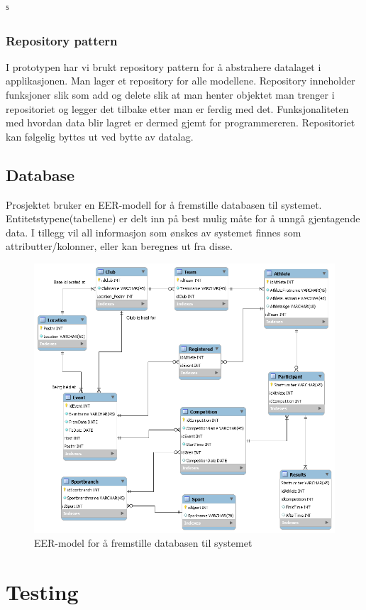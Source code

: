 ⁵\documentclass[norsk]{article}
\begin{document}
\subsubsection{Repository pattern}
I prototypen har vi brukt repository pattern for å abstrahere datalaget i applikasjonen. Man lager et repository for alle modellene. Repository inneholder funksjoner slik som add og delete slik at man henter objektet man trenger i repositoriet og legger det tilbake etter man er ferdig med det.
Funksjonaliteten med hvordan data blir lagret er dermed gjemt for programmereren. Repositoriet kan følgelig byttes ut ved bytte av datalag.

\subsection{Database}
Prosjektet bruker en EER-modell for å fremstille databasen til systemet. Entitetstypene(tabellene) er delt inn på best mulig måte for å unngå gjentagende data. I tillegg vil all informasjon som ønskes av systemet finnes som attributter/kolonner, eller kan beregnes ut fra disse.
    \begin{figure}[H]
    \centering 
        \includegraphics[scale=0.5]{images/datamodel.png}
        \caption{EER-model for å fremstille databasen til systemet}\label{fig:datamodel}
    \end{figure}
\section{Testing}
\end{document}
